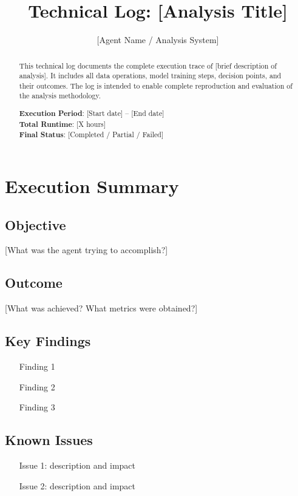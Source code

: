 \documentclass[12pt,modern,linenumbers]{aastex7}
\begin{document}
\title{Technical Log: [Analysis Title]}

\author{[Agent Name / Analysis System]}

\begin{abstract}
This technical log documents the complete execution trace of [brief description 
of analysis]. It includes all data operations, model training steps, decision 
points, and their outcomes. The log is intended to enable complete reproduction 
and evaluation of the analysis methodology.

\textbf{Execution Period}: [Start date] -- [End date]\\
\textbf{Total Runtime}: [X hours]\\
\textbf{Final Status}: [Completed / Partial / Failed]
\end{abstract}

\section{Execution Summary}

\subsection{Objective}
[What was the agent trying to accomplish?]

\subsection{Outcome}
[What was achieved? What metrics were obtained?]

\subsection{Key Findings}
\begin{enumerate}
    \item [Finding 1]
    \item [Finding 2]
    \item [Finding 3]
\end{enumerate}

\subsection{Known Issues}
\begin{itemize}
    \item [Issue 1: description and impact]
    \item [Issue 2: description and impact]
\end{itemize}
\end{document}
